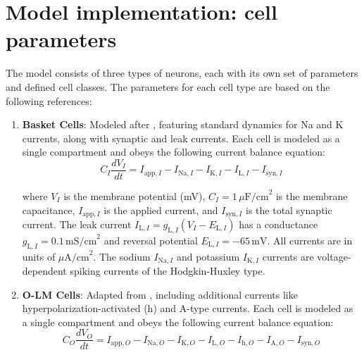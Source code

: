 \section{Model implementation: cell parameters}
The model consists of three types of neurons, each with its own set of
parameters and defined cell classes. The parameters for each cell type are
based on the following references:
\begin{enumerate}
    \item \textbf{Basket Cells}: Modeled after \textcite{wangGammaOscillationSynaptic1996},
          featuring standard dynamics for Na and K currents, along with synaptic and leak currents.
          Each cell is modeled as a single compartment and obeys the following current balance equation:
          \begin{equation}\label{eq:basket_cell}
              C_I \frac{dV_I}{dt} = I_{\text{app},I} - I_{\text{Na},I} - I_{\text{K},I} - I_{\text{L},I} - I_{\text{syn},I}
          \end{equation}

          where \(V_I\) is the membrane potential (mV), \(C_I = 1 \, \mu\text{F/cm}^2\)
          is the membrane capacitance, \(I_{\text{app},I}\) is the applied current, and
          \(I_{\text{syn},I}\) is the total synaptic current. The leak current
          \(I_{\text{L},I} = g_{\text{L},I}(V_I - E_{\text{L},I})\) has a conductance
          \(g_{\text{L},I} = 0.1 \, \text{mS/cm}^2\) and reversal potential
          \(E_{\text{L},I} = -65 \, \text{mV}\). All currents are in units of
          \(\mu\text{A/cm}^2\). The sodium \(I_{\text{Na},I}\) and potassium
          \(I_{\text{K},I}\) currents are voltage-dependent spiking currents of the
          Hodgkin-Huxley type.
    \item \textbf{O-LM Cells}: Adapted from \textcite{saragaActiveDendritesSpike2003},
          including additional currents like hyperpolarization-activated (h) and A-type currents.
          Each cell is modeled as a single compartment and obeys the following current balance equation:
          \begin{equation}\label{eq:olm_cell}
              C_O \frac{dV_O}{dt} = I_{\text{app},O} - I_{\text{Na},O} - I_{\text{K},O} - I_{\text{L},O} - I_{\text{h},O} - I_{\text{A},O} - I_{\text{syn},O}
          \end{equation}


\end{enumerate}
